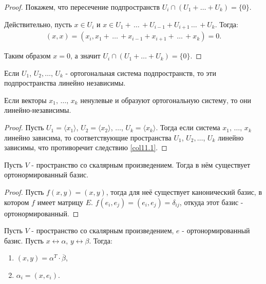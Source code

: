 \begin{proof}
    Покажем, что пересечение подпространств $U_i \cap (U_1 + \dots + U_k) = \{0\}$. 

    Действительно, пусть $x \in U_i$ и $x \in U_1 + \, \dots \, + U_{i-1} + U_{i+1} \, \dots \, + U_k$. Тогда:
    \begin{gather*}
        (x, x) = (x_i, x_1 + \, \dots \, + x_{i-1} + x_{i+1} + \, \dots \, + x_k) = 0.
    \end{gather*}

    Таким образом $x = 0$, а значит $U_i \cap (U_1 + \dots + U_k) = \{0\}$.
\end{proof}

\begin{corollary}
    \label{col11.1}
    Если $U_1$, $U_2, \dots$, $U_k$ - ортогональная система подпространств, то эти подпространства 
    линейно независимы.
\end{corollary}

\begin{corollary}
    Если векторы $x_1, \, \dots , \, x_k$ ненулевые и образуют ортогональную систему, то они линейно-независимы.
\end{corollary}

\begin{proof}
    Пусть $U_1 = \langle x_1 \rangle$, $U_2 = \langle x_2 \rangle$, $\dots$, $U_k = \langle x_k \rangle$.
    Тогда если система $x_1, \, \dots , \, x_k$ линейно зависима, то соответствующие пространства 
    $U_1$, $U_2, \dots$, $U_k$ линейно зависимы, что противоречит следствию \ref{col11.1}.
\end{proof}

\begin{proposition}
    Пусть $V$ - пространство со скалярным произведением. Тогда в нём существует ортонормированный базис.
\end{proposition}

\begin{proof}
    Пусть $f(x, y) = (x, y)$, тогда для неё существует канонический базис, в котором $f$ имеет 
    матрицу $E$. $f(e_i, e_j) = (e_i, e_j) = \delta_{ij}$, откуда этот базис - ортонормированный.
\end{proof}

\begin{corollary}
    Пусть $V$ - пространство со скалярным произведением, $e$ - ортонормированный базис. Пусть 
    $x \leftrightarrow \alpha$, $y \leftrightarrow \beta$. Тогда:
    \begin{enumerate}
        \item $(x, y) = \alpha^T \cdot \overline{\beta}$,
        \item $\alpha_i = (x, e_i)$.
    \end{enumerate}
\end{corollary}

